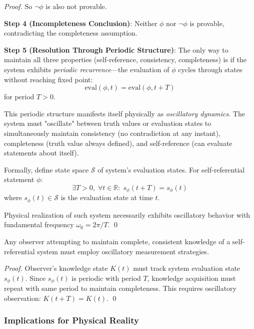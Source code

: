 \documentclass[11pt,onecolumn]{article}
\begin{document}
\begin{proof}
So $\neg \phi$ is also not provable.

\textbf{Step 4 (Incompleteness Conclusion)}: Neither $\phi$ nor $\neg \phi$ is provable, contradicting the completeness assumption.

\textbf{Step 5 (Resolution Through Periodic Structure)}: The only way to maintain all three properties (self-reference, consistency, completeness) is if the system exhibits \textit{periodic recurrence}---the evaluation of $\phi$ cycles through states without reaching fixed point:
\begin{equation}
\text{eval}(\phi, t) = \text{eval}(\phi, t + T)
\end{equation}
for period $T > 0$.

This periodic structure manifests itself physically as \textit{oscillatory dynamics}. The system must "oscillate" between truth values or evaluation states to simultaneously maintain consistency (no contradiction at any instant), completeness (truth value always defined), and self-reference (can evaluate statements about itself).

Formally, define state space $\mathcal{S}$ of system's evaluation states. For self-referential statement $\phi$:
\begin{equation}
\exists T > 0, \; \forall t \in \mathbb{R}: \; s_{\phi}(t + T) = s_{\phi}(t)
\end{equation}
where $s_{\phi}(t) \in \mathcal{S}$ is the evaluation state at time $t$.

Physical realization of such system necessarily exhibits oscillatory behavior with fundamental frequency $\omega_0 = 2\pi / T$. \qed
\end{proof}

\begin{corollary}
Any observer attempting to maintain complete, consistent knowledge of a self-referential system must employ oscillatory measurement strategies.
\end{corollary}

\begin{proof}
Observer's knowledge state $K(t)$ must track system evaluation state $s_{\phi}(t)$. Since $s_{\phi}(t)$ is periodic with period $T$, knowledge acquisition must repeat with same period to maintain completeness. This requires oscillatory observation: $K(t+T) = K(t)$. \qed
\end{proof}

\subsubsection{Implications for Physical Reality}
\end{document}
